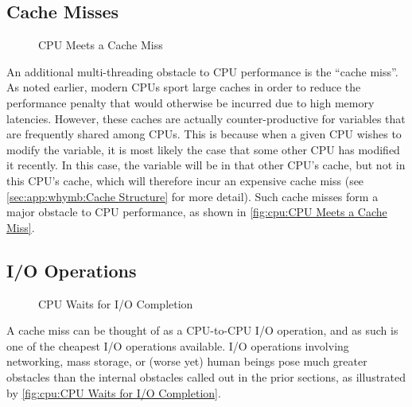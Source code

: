 \subsection{Cache Misses}
\label{sec:cpu:Cache Misses}

\begin{figure}
\centering
{}
\caption{CPU Meets a Cache Miss}
\end{figure}

An additional multi-threading obstacle to CPU performance is
the ``cache miss''.
As noted earlier, modern CPUs sport large caches in order to reduce the
performance penalty that would otherwise be incurred due to high memory
latencies.
However, these caches are actually counter-productive for variables that
are frequently shared among CPUs.
This is because when a given CPU wishes to modify the variable, it is
most likely the case that some other CPU has modified it recently.
In this case, the variable will be in that other CPU's cache, but not
in this CPU's cache, which will therefore incur an expensive cache miss
(see \cref{sec:app:whymb:Cache Structure} for more detail).
Such cache misses form a major obstacle to CPU performance, as shown
in \cref{fig:cpu:CPU Meets a Cache Miss}.

\QuickQuizEnd

\subsection{I/O Operations}
\label{sec:cpu:I/O Operations}

\begin{figure}
\centering
{}
\caption{CPU Waits for I/O Completion}
\end{figure}

A cache miss can be thought of as a CPU-to-CPU I/O operation, and as
such is one of the cheapest I/O operations available.
I/O operations involving networking, mass storage, or (worse yet) human
beings pose much greater obstacles than the internal obstacles called
out in the prior sections,
as illustrated by
\cref{fig:cpu:CPU Waits for I/O Completion}.

